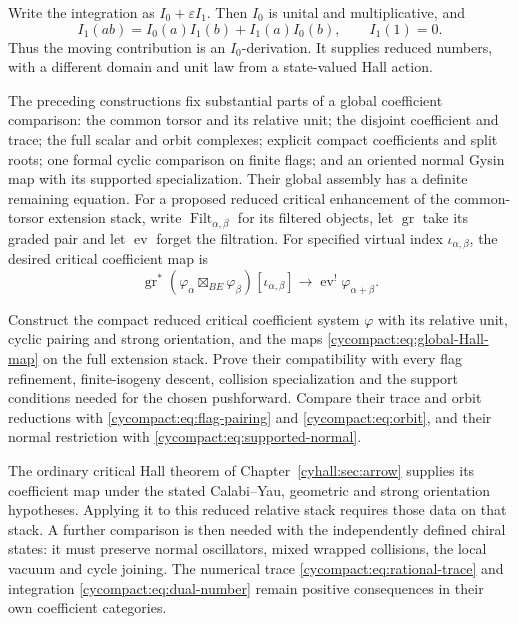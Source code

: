 Write the integration as $I_0+\varepsilon I_1$.
Then $I_0$ is unital and multiplicative, and
\begin{equation}\label{cycompact:eq:dual-number}
 I_1(ab)=I_0(a)I_1(b)+I_1(a)I_0(b),\qquad
 I_1(1)=0.
\end{equation}
Thus the moving contribution is an
$I_0$-derivation. It supplies reduced
numbers, with a different domain and unit
law from a state-valued Hall action.

The preceding constructions fix substantial
parts of a global coefficient comparison:
the common torsor and its relative unit;
the disjoint coefficient and trace; the
full scalar and orbit complexes; explicit
compact coefficients and split roots;
one formal cyclic comparison on finite
flags; and an oriented normal Gysin map
with its supported specialization.
Their global assembly has a definite
remaining equation. For a proposed reduced
critical enhancement of the common-torsor
extension stack, write
$\operatorname{Filt}_{\alpha,\beta}$ for its
filtered objects, let $\operatorname{gr}$ take its
graded pair and let $\operatorname{ev}$
forget the filtration. For specified
virtual index $\iota_{\alpha,\beta}$,
the desired critical coefficient map is
\begin{equation}\label{cycompact:eq:global-Hall-map}
 \operatorname{gr}^*
    (\varphi_\alpha\boxtimes_{BE}\varphi_\beta)
       [\iota_{\alpha,\beta}]
 \longrightarrow
 \operatorname{ev}^!\varphi_{\alpha+\beta}.
\end{equation}

\begin{problem}\label{cycompact:prob:global}
Construct the compact reduced critical
coefficient system $\varphi$ with its
relative unit, cyclic pairing and strong
orientation, and the maps
\eqref{cycompact:eq:global-Hall-map} on the
full extension stack. Prove their
compatibility with every flag refinement,
finite-isogeny descent, collision
specialization and the support conditions
needed for the chosen pushforward.
Compare their trace and orbit reductions
with \eqref{cycompact:eq:flag-pairing} and
\eqref{cycompact:eq:orbit}, and their
normal restriction with
\eqref{cycompact:eq:supported-normal}.
\end{problem}

The ordinary critical Hall theorem of
Chapter~\ref{cyhall:sec:arrow} supplies its
coefficient map under the stated
Calabi--Yau, geometric and strong
orientation hypotheses. Applying it to
this reduced relative stack requires
those data on that stack. A further
comparison is then needed with the
independently defined chiral states:
it must preserve normal oscillators,
mixed wrapped collisions, the local
vacuum and cycle joining. The numerical
trace \eqref{cycompact:eq:rational-trace}
and integration \eqref{cycompact:eq:dual-number}
remain positive consequences in their
own coefficient categories.
